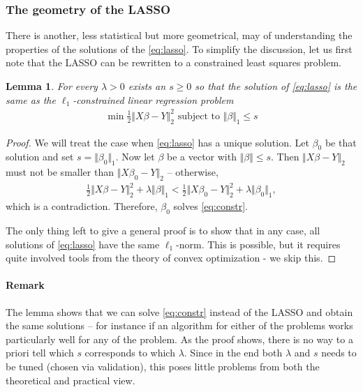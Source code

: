 \documentclass{article}
\newtheorem{lemma}{Lemma}
\newcommand{\norm}[1]{\Vert #1 \Vert}
\begin{document}
\subsubsection{The geometry of the LASSO} There is another, less statistical but more geometrical, may of  understanding the properties of the solutions of the \eqref{eq:lasso}. To simplify the discussion, let us first note that the LASSO can be rewritten to a constrained least squares problem.
\begin{lemma}
    For every $\lambda>0$ exists an $s\geq 0 $ so that the solution of \eqref{eq:lasso} is the same as the $\ell_1$-constrained linear regression problem
\begin{align}
    \min \tfrac{1}{2}\norm{X\beta-Y}_2^2 \text{ subject to } \norm{\beta}_1 \leq s \label{eq:constr}
\end{align}
\end{lemma} 
\begin{proof}
    We will treat the case when \eqref{eq:lasso} has a unique solution. Let $\beta_0$ be that solution and set $s = \norm{\beta_0}_1$. Now let $\beta$ be a vector with $\norm{\beta} \leq s$. Then $\norm{X\beta-Y}_2$ must not be smaller than $\norm{X\beta_0 -Y}_2$ -- otherwise,
    \begin{align*}
        \tfrac{1}{2}\norm{X\beta-Y}_2^2 + \lambda \norm{\beta}_1 < \tfrac{1}{2}\norm{X\beta_0-Y}_2^2 + \lambda \norm{\beta_0}_1, 
    \end{align*}
    which is a contradiction. Therefore, $\beta_0$ solves \eqref{eq:constr}. 

    The only thing left to give a general proof is to show that in any case, all solutions of \eqref{eq:lasso} have the same $\ell_1$-norm. This is possible, but it requires quite involved tools from the theory of convex optimization - we skip this.
\end{proof}

\paragraph{Remark} The lemma shows that we can solve \eqref{eq:constr} instead of the LASSO and obtain the same solutions -- for instance if an algorithm for either of the problems works particularly well for any of the problem. As the proof shows, there is no way to a priori tell which $s$ corresponds to which $\lambda$. Since in the end both $\lambda$ and $s$ needs to be tuned (chosen via validation), this poses little problems from both the theoretical and practical view.
\end{document}
